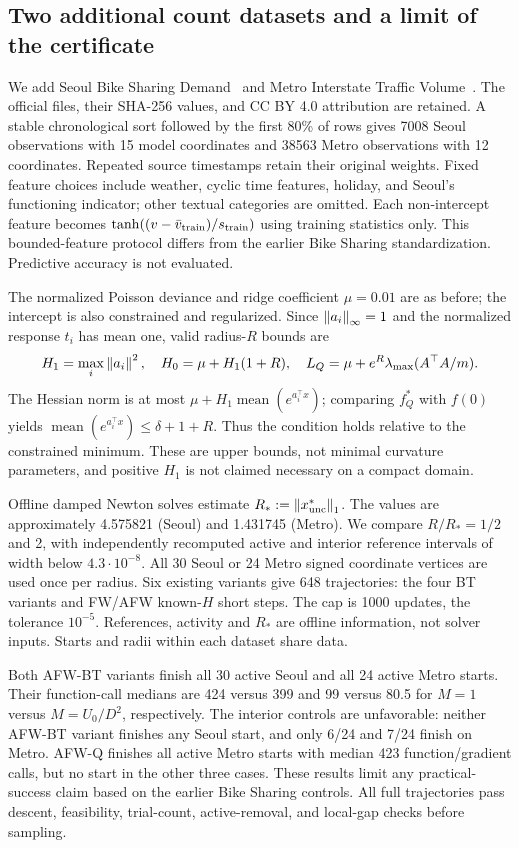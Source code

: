 \subsection{Two additional count datasets and a limit of the certificate}
\label{sec:multidata}
We add Seoul Bike Sharing Demand~\cite{seoul} and Metro Interstate
Traffic Volume~\cite{metro}. The official files, their SHA-256 values,
and CC BY 4.0 attribution are retained. A stable chronological sort
followed by the first 80\% of rows gives 7008 Seoul observations with
15 model coordinates and 38563 Metro observations with 12 coordinates.
Repeated source timestamps retain their original weights.
Fixed feature choices include weather, cyclic time features, holiday,
and Seoul's functioning indicator; other textual categories are omitted.
Each non-intercept feature becomes
$\tanh((v-\bar v_{\rm train})/s_{\rm train})$ using training statistics
only. This bounded-feature protocol differs from the earlier Bike
Sharing standardization. Predictive accuracy is not evaluated.

The normalized Poisson deviance and ridge coefficient $\mu=0.01$ are
as before; the intercept is also constrained and regularized. Since
$\left\|a_i\right\|_\infty=1$ and the normalized response $t_i$ has mean one,
valid radius-$R$ bounds are
\[
 H_1=\max_i\left\|a_i\right\|^2,\quad H_0=\mu+H_1(1+R),\quad
 L_Q=\mu+e^R\lambda_{\max}(A^\top A/m).
\]
The Hessian norm is at most
$\mu+H_1\operatorname{mean}(e^{a_i^\top x})$; comparing $f_Q^*$ with
$f(0)$ yields $\operatorname{mean}(e^{a_i^\top x})\le\delta+1+R$.
Thus the condition holds relative to the constrained minimum. These
are upper bounds, not minimal curvature parameters, and positive
$H_1$ is not claimed necessary on a compact domain.

Offline damped Newton solves estimate $R_*:=\left\|x^*_{\rm unc}\right\|_1$.
The values are approximately 4.575821 (Seoul) and 1.431745 (Metro). We compare
$R/R_*=1/2$ and 2, with independently recomputed active and interior
reference intervals of width below $4.3\cdot10^{-8}$. All 30 Seoul or
24 Metro signed coordinate vertices are used once per radius. Six
existing variants give 648 trajectories: the four BT variants and
FW/AFW known-$H$ short steps. The cap is 1000 updates, the tolerance
$10^{-5}$. References, activity and $R_*$ are offline information, not
solver inputs. Starts and radii within each dataset share data.

Both AFW-BT variants finish all 30 active Seoul and all 24 active Metro
starts. Their function-call medians are 424 versus 399 and 99 versus
80.5 for $M=1$ versus $M=U_0/D^2$, respectively. The interior controls
are unfavorable: neither AFW-BT variant finishes any Seoul start,
and only 6/24 and 7/24 finish on Metro. AFW-Q finishes all active Metro
starts with median 423 function/gradient calls, but no start in the
other three cases. These results limit any practical-success claim
based on the earlier Bike Sharing controls. All full trajectories
pass descent, feasibility, trial-count, active-removal, and local-gap
checks before sampling.

